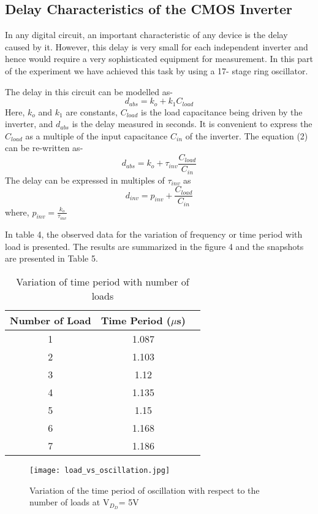 \documentclass[12pt]{article}
\begin{document}
\subsection{Delay Characteristics of the CMOS Inverter}
In any digital circuit, an important characteristic of any device is the delay caused by it.
However, this delay is very small for each independent inverter and hence would require a very sophisticated equipment for measurement. In this part of the experiment we have achieved this task by using a 17- stage ring oscillator.  
\par The delay in this circuit can be modelled as-
\begin{equation}
    d_{abs}= k_o + k_{1}C_{load}
\end{equation}
Here, $k_o$ and $k_1$ are constants, $C_{load}$ is the load capacitance being driven by
the inverter, and $d_{abs}$ is the delay measured in seconds. It is convenient to express the $C_{load}$ as a multiple of the input capacitance $C_{in}$ of the inverter. The equation (2) can be re-written as-
\begin{equation}
    d_{abs}= k_o + \tau_{inv}\frac{C_{load}}{C_{in}}
\end{equation}
The delay can be expressed in multiples of $\tau_{inv}$ as
\begin{equation}
    d_{inv}= p_{inv} + \frac{C_{load}}{C_{in}}
\end{equation}
where, $p_{inv} = \frac{k_o}{\tau_{inv}}$\\
\par In table 4, the observed data for the variation of frequency or time period with load is presented. The results are summarized in the figure 4 and the snapshots are presented in Table 5.
\begin{table}[H]
\centering
\begin{tabular}{| c | c | c |} 
\hline
\textbf{Number of Load} & \textbf{Time Period ($\mu$s)}\\ 
\hline
1 & 1.087 \\
2 & 1.103 \\
3 & 1.12  \\
4 & 1.135 \\
5 & 1.15  \\
6 & 1.168 \\
7 & 1.186 \\
\hline
\end{tabular}
\caption{Variation of time period with number of loads}

\end{table}
\begin{figure}
\texttt{[image: load\_vs\_oscillation.jpg]}
\centering
\caption{Variation of the time period of oscillation with respect to the number of loads at V$_D_D$= 5V}
\end{figure}
\end{document}
